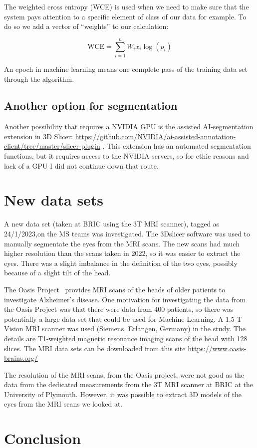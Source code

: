 \documentclass[12pt]{article}
\begin{document}
The weighted cross entropy (WCE) is used when we need to make sure
that the system pays attention to a specific element of class of our
data for example. To do so we add a vector of “weights” to our
calculation:

\begin{equation}
\mbox{WCE} = \sum_{i=1}^{n} W_i x_i \log(p_i)
\end{equation}

An epoch in machine learning means one complete pass of the training
data set through the algorithm.


\subsection{Another option for segmentation}

Another possibility that requires a NVIDIA GPU is the assisted
AI-segmentation extension in 3D Slicer:
\url{https://github.com/NVIDIA/ai-assisted-annotation-client/tree/master/slicer-plugin}
.
This extension has an automated segmentation functions, but it
requires access to the NVIDIA servers, so for ethic reasons and lack
of a GPU I did not continue down that route.


\section{New data sets}

A new data set (taken at BRIC using the 3T MRI scanner), tagged as
24/1/2023,on the MS teams was investigated. The 3Dslicer software was
used to manually segmentate the eyes from the MRI scans. The new scans
had much higher resolution than the scans taken in 2022, so it was
easier to extract the eyes. There was a slight imbalance in the
definition of the two eyes, possibly because of a slight tilt of the
head.


The Oasis Project~\cite{van2021mri} provides MRI scans of the heads of
older patients to investigate Alzheimer's disease.  One motivation for
investigating the data from the Oasis Project was that there were data
from 400 patients, so there was potentially a large data set that
could be used for Machine Learning.  A 1.5-T Vision MRI scanner was
used (Siemens, Erlangen, Germany) in the study.  The details are
T1-weighted magnetic resonance imaging scans of the head with 128
slices.  The MRI data sets can be downloaded from this site
\url{https://www.oasis-brains.org/}


The resolution of the MRI scans, from the Oasis project, were not good
as the data from the dedicated measurements from the 3T MRI scanner at
BRIC at the University of Plymouth. However, it was possible to
extract 3D models of the eyes from the MRI scans we looked at.



\section{Conclusion}



\end{document}
